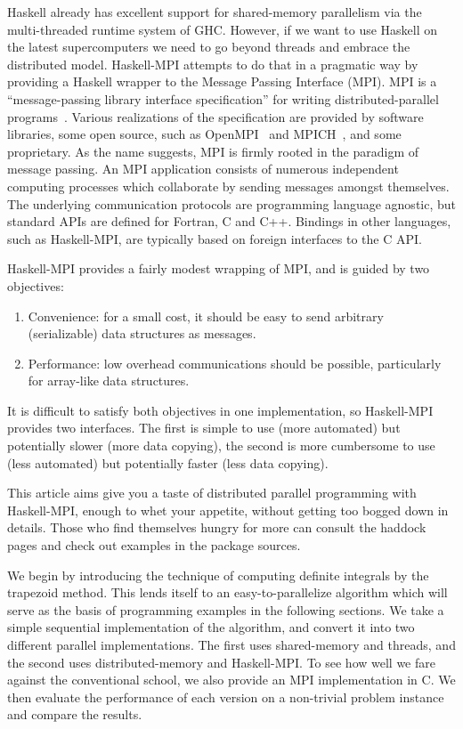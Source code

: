 \documentclass{tmr}
\begin{document}
Haskell already has excellent support for shared-memory parallelism via the multi-threaded runtime
system of GHC. However, if we want to use Haskell on the latest supercomputers we need to go beyond
threads and embrace the distributed model. Haskell-MPI attempts to do that in a pragmatic way by
providing a Haskell wrapper to the Message Passing Interface (MPI). MPI is a ``message-passing library interface specification''
for writing distributed-parallel programs~\cite{mpi-report}. Various realizations of the
specification are provided by software libraries, some open source,
such as OpenMPI~\cite{open-mpi} and MPICH~\cite{mpich}, and some proprietary.
As the name suggests, MPI is firmly rooted in the paradigm of message passing.
An MPI application consists of numerous independent computing processes
which collaborate by sending messages amongst themselves.
The underlying communication protocols are programming language agnostic, but standard APIs are
defined for Fortran, C and C++. Bindings in other languages, such as Haskell-MPI,
are typically based on foreign interfaces to the C API.

Haskell-MPI provides a fairly modest wrapping of MPI, and is guided by two objectives:
\begin{enumerate}
 \item Convenience: for a small cost, it should be easy to send arbitrary (serializable)
data structures as messages.
 \item Performance: low overhead communications should be possible,
particularly for array-like data structures.
\end{enumerate}
It is difficult to satisfy both objectives in one implementation, so Haskell-MPI provides two interfaces.
The first is simple to use (more automated) but potentially slower (more data copying), the second
is more cumbersome to use (less automated) but potentially faster (less data copying).

This article aims give you a taste of distributed parallel programming with Haskell-MPI, enough to
whet your appetite, without getting too bogged down in details. Those who find themselves hungry for
more can consult the haddock pages and check out examples in the package sources.

We begin by introducing the technique of computing definite integrals by the trapezoid method.
This lends itself to an easy-to-parallelize algorithm which will serve as the
basis of programming examples in the following sections. We take a simple sequential implementation
of the algorithm, and convert it into two different parallel implementations.
The first uses shared-memory and threads, and the second uses distributed-memory and Haskell-MPI.
To see how well we fare against the conventional school, we also provide an MPI implementation in C.
We then evaluate the performance of each version on a non-trivial problem instance and compare the results.
\end{document}
